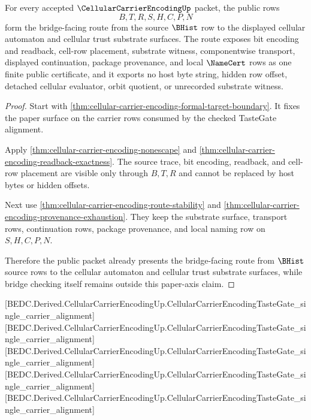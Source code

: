 \begin{theorem}
\label{thm:cellular-carrier-encoding-bridge-facing-route}
For every accepted $\CellularCarrierEncodingUp$ packet, the public rows
$$
B,T,R,S,H,C,P,N
$$
form the bridge-facing route from the source $\BHist$ row to the displayed cellular automaton and cellular trust substrate surfaces. The route exposes bit encoding and readback, cell-row placement, substrate witness, componentwise transport, displayed continuation, package provenance, and local $\NameCert$ rows as one finite public certificate, and it exports no host byte string, hidden row offset, detached cellular evaluator, orbit quotient, or unrecorded substrate witness.
\end{theorem}
\begin{proof}
Start with \autoref{thm:cellular-carrier-encoding-formal-target-boundary}. It fixes the paper surface on the carrier rows consumed by the checked TasteGate alignment.

Apply \autoref{thm:cellular-carrier-encoding-nonescape} and \autoref{thm:cellular-carrier-encoding-readback-exactness}. The source trace, bit encoding, readback, and cell-row placement are visible only through $B,T,R$ and cannot be replaced by host bytes or hidden offsets.

Next use \autoref{thm:cellular-carrier-encoding-route-stability} and \autoref{thm:cellular-carrier-encoding-provenance-exhaustion}. They keep the substrate surface, transport rows, continuation rows, package provenance, and local naming row on $S,H,C,P,N$.

Therefore the public packet already presents the bridge-facing route from $\BHist$ source rows to the cellular automaton and cellular trust substrate surfaces, while bridge checking itself remains outside this paper-axis claim.
\end{proof}

[BEDC.Derived.CellularCarrierEncodingUp.CellularCarrierEncodingTasteGate\_single\_carrier\_alignment]
[BEDC.Derived.CellularCarrierEncodingUp.CellularCarrierEncodingTasteGate\_single\_carrier\_alignment]
[BEDC.Derived.CellularCarrierEncodingUp.CellularCarrierEncodingTasteGate\_single\_carrier\_alignment]
[BEDC.Derived.CellularCarrierEncodingUp.CellularCarrierEncodingTasteGate\_single\_carrier\_alignment]
[BEDC.Derived.CellularCarrierEncodingUp.CellularCarrierEncodingTasteGate\_single\_carrier\_alignment]

